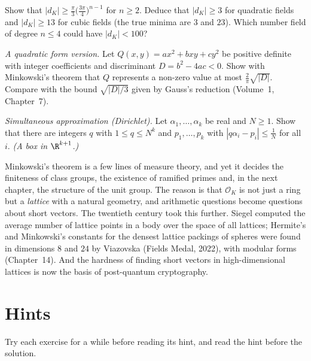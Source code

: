 \begin{exercise}[$\star\star$]\label{ex:discbound}
Show that $|d_K|\ge\frac\pi3\bigl(\frac{3\pi}4\bigr)^{n-1}$ for $n\ge2$. Deduce that $|d_K|\ge3$ for quadratic fields and
$|d_K|\ge13$ for cubic fields (the true minima are $3$ and $23$). Which number field of degree $n\le4$ could have
$|d_K|<100$?
\end{exercise}

\begin{exercise}[$\star\star$]\label{ex:quadmin}
\emph{A quadratic form version.} Let $Q(x,y)=ax^2+bxy+cy^2$ be positive definite with integer coefficients and
discriminant $D=b^2-4ac<0$. Show with Minkowski's theorem that $Q$ represents a non-zero value at most
$\frac2\pi\sqrt{|D|}$. Compare with the bound $\sqrt{|D|/3}$ given by Gauss's reduction (Volume~1, Chapter~7).
\end{exercise}

\begin{exercise}[$\star\star\star$]\label{ex:simult}
\emph{Simultaneous approximation (Dirichlet).} Let $\alpha_1,\dots,\alpha_k$ be real and $N\ge1$. Show that there are integers
$q$ with $1\le q\le N^k$ and $p_1,\dots,p_k$ with $|q\alpha_i-p_i|\le\frac1N$ for all $i$. \emph{(A box in $\R^{k+1}$.)}
\end{exercise}

\begin{beauty}
Minkowski's theorem is a few lines of measure theory, and yet it decides the finiteness of class groups, the existence of
ramified primes and, in the next chapter, the structure of the unit group. The reason is that $\mathcal O_K$ is not just
a ring but a \emph{lattice} with a natural geometry, and arithmetic questions become questions about short vectors. The
twentieth century took this further. Siegel computed the average number of lattice points in a body over the space of
all lattices; Hermite's and Minkowski's constants for the densest lattice packings of spheres were found in dimensions
$8$ and $24$ by Viazovska (Fields Medal, 2022), with modular forms (Chapter~14). And the hardness of finding short
vectors in high-dimensional lattices is now the basis of post-quantum cryptography.
\end{beauty}

\section{Hints}

Try each exercise for a while before reading its hint, and read the hint before the solution.

